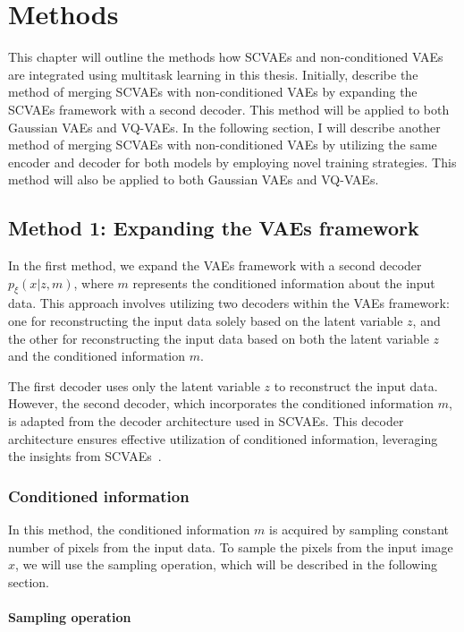 \chapter{Methods}

This chapter will outline the methods how SCVAEs and non-conditioned VAEs are integrated using multitask learning in this thesis. Initially, describe the method of merging SCVAEs with non-conditioned VAEs by expanding the SCVAEs framework with a second decoder. This method will be applied to both Gaussian VAEs and VQ-VAEs. In the following section, I will describe another method of merging SCVAEs with non-conditioned VAEs by utilizing the same encoder and decoder for both models by employing novel training strategies. This method will also be applied to both Gaussian VAEs and VQ-VAEs.

\section{Method 1: Expanding the VAEs framework}

In the first method, we expand the VAEs framework with a second decoder $p_\xi(x|z,m)$, where $m$ represents the conditioned information about the input data.  This approach involves utilizing two decoders within the VAEs framework: one for reconstructing the input data solely based on the latent variable $z$, and the other for reconstructing the input data based on both the latent variable $z$ and the conditioned information $m$. 

The first decoder uses only the latent variable $z$ to reconstruct the input data. However, the second decoder, which incorporates the conditioned information $m$, is adapted from the decoder architecture used in SCVAEs. This decoder architecture ensures effective utilization of conditioned information, leveraging the insights from SCVAEs~\cite{Gundersen_2021}.

\subsection{Conditioned information}

In this method, the conditioned information $m$ is acquired by sampling constant number of pixels from the input data. To sample the pixels from the input image $x$, we will use the sampling operation, which will be described in the following section.

\subsubsection{Sampling operation}

